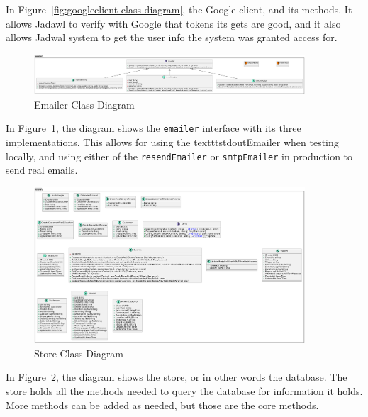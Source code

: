 In Figure~\ref{fig:googleclient-class-diagram}, the Google client, and its methods.
It allows Jadawl to verify with Google that tokens its gets are good, and it also allows Jadwal system to get the user info the system was granted access for.

\newpage

\begin{figure}[!h]
    \centering
    \includegraphics[width=0.9\textwidth]{images/docs/diagrams/class/class-diagram/emailer.png}
    \caption{Emailer Class Diagram}
    \label{fig:emailer-class-diagram}
\end{figure}

In Figure~\ref{fig:emailer-class-diagram}, the diagram shows the \texttt{emailer} interface with its three implementations. This allows for using the texttt{stdoutEmailer} when testing locally, and using either of the \texttt{resendEmailer} or \texttt{smtpEmailer} in production to send real emails.

\newpage

\begin{figure}[!h]
    \centering
    \includegraphics[width=0.9\textwidth]{images/docs/diagrams/class/class-diagram/store.png}
    \caption{Store Class Diagram}
    \label{fig:store-class-diagram}
\end{figure}

In Figure~\ref{fig:store-class-diagram}, the diagram shows the store, or in other words the database. The store holds all the methods needed to query the database for information it holds. More methods can be added as needed, but those are the core methods.

\newpage

